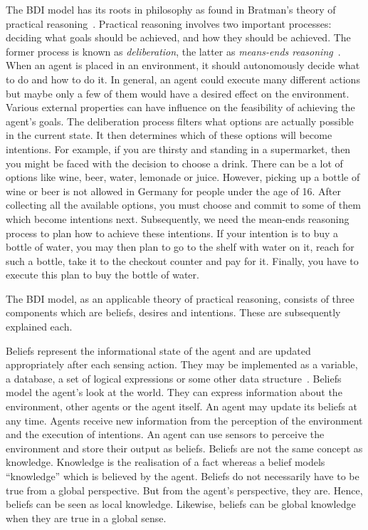 The BDI model has its roots in philosophy as found in Bratman's theory of practical reasoning~\cite{Sebastian_Hierarchical_2006}.
Practical reasoning involves two important processes: deciding what goals should be achieved, and how they should be achieved.
The former process is known as \emph{deliberation}, the latter as \emph{means-ends reasoning}~\cite{Gerhard_MultiSystem_1999}.
When an agent is placed in an environment, it should autonomously decide what to do and how to do it.
In general, an agent could execute many different actions but maybe only a few of them would have a desired effect on the environment.
Various external properties can have influence on the feasibility of achieving the agent's goals.
The deliberation process filters what options are actually possible in the current state.
It then determines which of these options will become intentions.
For example, if you are thirsty and standing in a supermarket, then you might be faced with the decision to choose a drink.
There can be a lot of options like wine, beer, water, lemonade or juice.
However, picking up a bottle of wine or beer is not allowed in Germany for people under the age of 16. %
After collecting all the available options, you must choose and commit to some of them which become intentions next.
Subsequently, we need the mean-ends reasoning process to plan how to achieve these intentions.
If your intention is to buy a bottle of water, you may then plan to go to the shelf with water on it, reach for such a bottle, take it to the checkout counter and pay for it.
Finally, you have to execute this plan to buy the bottle of water.

The BDI model, as an applicable theory of practical reasoning, consists of three components which are beliefs, desires and intentions.
These are subsequently explained each.

Beliefs represent the informational state of the agent and are updated appropriately after each sensing action.
They may be implemented as a variable, a database, a set of logical expressions or some other data structure~\cite{Rao_BDITheory_1995}.
Beliefs model the agent's look at the world.
They can express information about the environment, other agents or the agent itself.
An agent may update its beliefs at any time.
Agents receive new information from the perception of the environment and the execution of intentions.
An agent can use sensors to perceive the environment and store their output as beliefs.
Beliefs are not the same concept as knowledge.
Knowledge is the realisation of a fact whereas a belief models \enquote{knowledge} which is believed by the agent.
Beliefs do not necessarily have to be true from a global perspective.
But from the agent's perspective, they are.
Hence, beliefs can be seen as local knowledge.
Likewise, beliefs can be global knowledge when they are true in a global sense.


